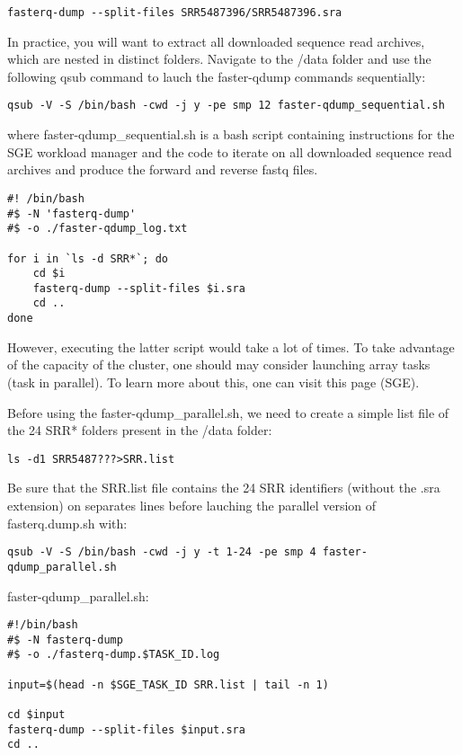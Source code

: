 \begin{verbatim}
fasterq-dump --split-files SRR5487396/SRR5487396.sra
\end{verbatim}

In practice, you will want to extract all downloaded sequence read archives, which are nested in distinct folders. Navigate to the /data folder and use the following qsub command to lauch the faster-qdump commands sequentially:

\begin{verbatim}
qsub -V -S /bin/bash -cwd -j y -pe smp 12 faster-qdump_sequential.sh
\end{verbatim}

where faster-qdump\_sequential.sh is a bash script containing instructions for the SGE workload manager and the code to iterate on all downloaded sequence read archives and produce the forward and reverse fastq files.

\begin{verbatim}
#! /bin/bash
#$ -N 'fasterq-dump'
#$ -o ./faster-qdump_log.txt
	
for i in `ls -d SRR*`; do
	cd $i
	fasterq-dump --split-files $i.sra
	cd ..
done
\end{verbatim}



However, executing the latter script would take a lot of times. To take advantage of the capacity of the cluster, one should may consider launching array tasks (task in parallel). To learn more about this, one can visit this page (SGE).

Before using the faster-qdump\_parallel.sh, we need to create a simple list file of the 24 SRR* folders present in the /data folder:

\begin{verbatim}
ls -d1 SRR5487???>SRR.list
\end{verbatim}

Be sure that the SRR.list file contains the 24 SRR identifiers (without the .sra extension) on separates lines before lauching the parallel version of fasterq.dump.sh with:
\begin{verbatim}
qsub -V -S /bin/bash -cwd -j y -t 1-24 -pe smp 4 faster-qdump_parallel.sh
\end{verbatim}

\noindent faster-qdump\_parallel.sh:
\begin{verbatim}
#!/bin/bash
#$ -N fasterq-dump
#$ -o ./fasterq-dump.$TASK_ID.log

input=$(head -n $SGE_TASK_ID SRR.list | tail -n 1)

cd $input
fasterq-dump --split-files $input.sra
cd ..
\end{verbatim}


